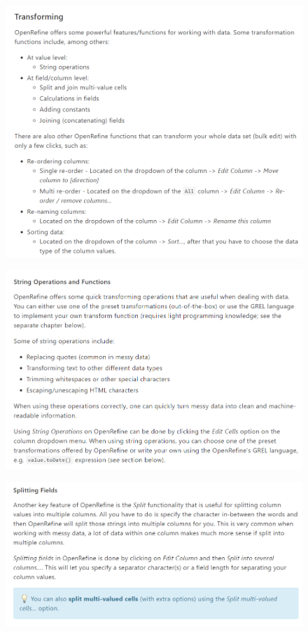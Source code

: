 \begin{figure}[H]
    \includegraphics[width=\linewidth]{./Figures/Appendices/worksheet/15.png}
\end{figure}
\begin{figure}[H]
    \includegraphics[width=\linewidth]{./Figures/Appendices/worksheet/16.png}
\end{figure}
\begin{figure}[H]
    \includegraphics[width=\linewidth]{./Figures/Appendices/worksheet/17.png}
\end{figure}
